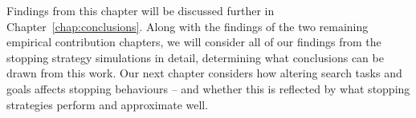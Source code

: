 Findings from this chapter will be discussed further in Chapter~\ref{chap:conclusions}. Along with the findings of the two remaining empirical contribution chapters, we will consider all of our findings from the stopping strategy simulations in detail, determining what conclusions can be drawn from this work. Our next chapter considers how altering search tasks and goals affects stopping behaviours -- and whether this is reflected by what stopping strategies perform and approximate well.

\newpage
\thispagestyle{empty}
\mbox{}